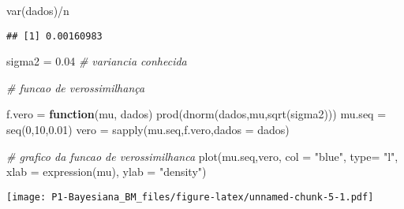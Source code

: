\documentclass[
]{article}
\newenvironment{Shaded}{\begin{snugshade}}{\end{snugshade}}
\newcommand{\AttributeTok}[1]{\textcolor[rgb]{0.77,0.63,0.00}{#1}}
\newcommand{\CommentTok}[1]{\textcolor[rgb]{0.56,0.35,0.01}{\textit{#1}}}
\newcommand{\ControlFlowTok}[1]{\textcolor[rgb]{0.13,0.29,0.53}{\textbf{#1}}}
\newcommand{\DecValTok}[1]{\textcolor[rgb]{0.00,0.00,0.81}{#1}}
\newcommand{\FloatTok}[1]{\textcolor[rgb]{0.00,0.00,0.81}{#1}}
\newcommand{\FunctionTok}[1]{\textcolor[rgb]{0.00,0.00,0.00}{#1}}
\newcommand{\NormalTok}[1]{#1}
\newcommand{\OtherTok}[1]{\textcolor[rgb]{0.56,0.35,0.01}{#1}}
\newcommand{\SpecialCharTok}[1]{\textcolor[rgb]{0.00,0.00,0.00}{#1}}
\newcommand{\StringTok}[1]{\textcolor[rgb]{0.31,0.60,0.02}{#1}}
\begin{document}
\begin{Shaded}
\begin{Highlighting}[]
 \FunctionTok{var}\NormalTok{(dados)}\SpecialCharTok{/}\NormalTok{n}
\end{Highlighting}
\end{Shaded}

\begin{verbatim}
## [1] 0.00160983
\end{verbatim}

\begin{Shaded}
\begin{Highlighting}[]
\NormalTok{ sigma2 }\OtherTok{=} \FloatTok{0.04} \CommentTok{\# variancia conhecida}
\end{Highlighting}
\end{Shaded}

\begin{Shaded}
\begin{Highlighting}[]
 \CommentTok{\# funcao de verossimilhança}

\NormalTok{ f.vero }\OtherTok{=} \ControlFlowTok{function}\NormalTok{(mu, dados) }\FunctionTok{prod}\NormalTok{(}\FunctionTok{dnorm}\NormalTok{(dados,mu,}\FunctionTok{sqrt}\NormalTok{(sigma2)))}
\NormalTok{ mu.seq }\OtherTok{=} \FunctionTok{seq}\NormalTok{(}\DecValTok{0}\NormalTok{,}\DecValTok{10}\NormalTok{,}\FloatTok{0.01}\NormalTok{)}
\NormalTok{ vero }\OtherTok{=} \FunctionTok{sapply}\NormalTok{(mu.seq,f.vero,}\AttributeTok{dados =}\NormalTok{ dados)}
\end{Highlighting}
\end{Shaded}

\begin{Shaded}
\begin{Highlighting}[]
\CommentTok{\# grafico da funcao de verossimilhanca       }
 \FunctionTok{plot}\NormalTok{(mu.seq,vero,  }\AttributeTok{col =} \StringTok{"blue"}\NormalTok{, }\AttributeTok{type=} \StringTok{"l"}\NormalTok{, }\AttributeTok{xlab =} \FunctionTok{expression}\NormalTok{(mu), }\AttributeTok{ylab =} \StringTok{"density"}\NormalTok{)}
\end{Highlighting}
\end{Shaded}

\texttt{[image: P1-Bayesiana\_BM\_files/figure-latex/unnamed-chunk-5-1.pdf]}
\end{document}
